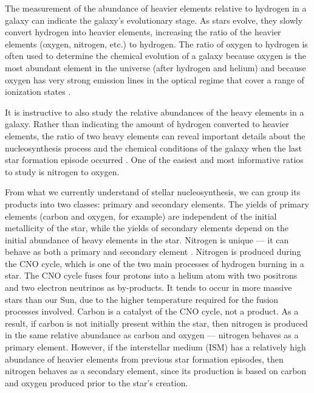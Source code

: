 The measurement of the abundance of heavier elements relative to hydrogen in a 
galaxy can indicate the galaxy's evolutionary stage.  As stars evolve, they 
slowly convert hydrogen into heavier elements, increasing the ratio of the 
heavier elements (oxygen, nitrogen, etc.) to hydrogen.  The ratio of oxygen to 
hydrogen is often used to determine the chemical evolution of a galaxy because 
oxygen is the most abundant element in the universe (after hydrogen and helium) 
and because oxygen has very strong emission lines in the optical regime that 
cover a range of ionization states \citep{Kewley02}.

It is instructive to also study the relative abundances of the heavy elements in 
a galaxy.  Rather than indicating the amount of hydrogen converted to heavier 
elements, the ratio of two heavy elements can reveal important details about the 
nucleosynthesis process and the chemical conditions of the galaxy when the last 
star formation episode occurred \citep{Izotov99}.  One of the easiest and most 
informative ratios to study is nitrogen to oxygen.

From what we currently understand of stellar nucleosynthesis, we can group its 
products into two classes: primary and secondary elements.  The yields of 
primary elements (carbon and oxygen, for example) are independent of the initial 
metallicity of the star, while the yields of secondary elements depend on the 
initial abundance of heavy elements in the star.  Nitrogen is unique --- it can 
behave as both a primary and secondary element \citep{Matteucci86}.  Nitrogen is 
produced during the CNO cycle, which is one of the two main processes of 
hydrogen burning in a star.  The CNO cycle fuses four protons into a helium atom 
with two positrons and two electron neutrinos as by-products.  It tends to occur 
in more massive stars than our Sun, due to the higher temperature required for 
the fusion processes involved.  Carbon is a catalyst of the CNO cycle, not a 
product.  As a result, if carbon is not initially present within the star, then 
nitrogen is produced in the same relative abundance as carbon and oxygen --- 
nitrogen behaves as a primary element.  However, if the interstellar medium 
(ISM) has a relatively high abundance of heavier elements from previous star 
formation episodes, then nitrogen behaves as a secondary element, since its 
production is based on carbon and oxygen produced prior to the star's creation.

